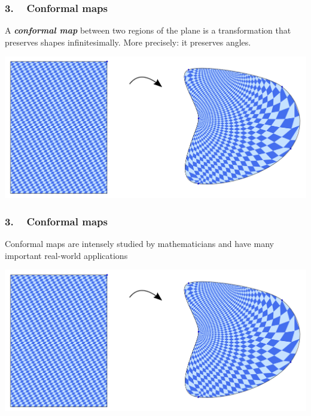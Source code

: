 
\begin{frame}
\frametitle{3. ~ Conformal maps}

A \emph{\bfseries conformal map} between two regions of the plane is a transformation that preserves shapes infinitesimally.
More precisely: it preserves angles.

\bigskip
\pause

\begin{center}
\includegraphics[width=\textwidth]{Conf1.pdf}
\end{center}

\end{frame}




\begin{frame}
\frametitle{3. ~ Conformal maps}

Conformal maps are intensely studied by mathematicians and have many important real-world applications

\bigskip
\pause

\begin{center}
\includegraphics[width=\textwidth]{Conf1.pdf}
\end{center}

\end{frame}